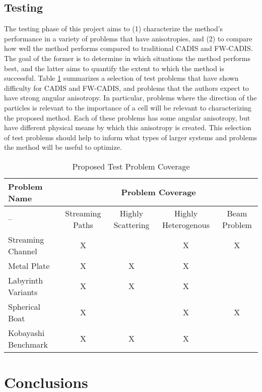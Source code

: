 \documentclass{mc2015}
\begin{document}
\subsection{Testing}
\label{sec:Testing}

The testing phase of this project aims to (1) characterize the method's performance in a variety of problems that have anisotropies, and (2) to compare how well the method performs compared to traditional CADIS and FW-CADIS.
The goal of the former is to determine in which situations the method performs best, and the latter aims to quantify the extent to which the method is successful. 
Table \ref{tab:testprobs} summarizes a selection of test problems that have shown difficulty for CADIS and FW-CADIS, and problems that the authors expect to have strong angular anisotropy. 
In particular, problems where the direction of the particles is relevant to the importance of a cell will be relevant to characterizing the proposed method. Each of these problems has some angular anisotropy, but have different physical means by which this anisotropy is created. This selection of test problems should help to inform what types of larger systems and problems the method will be useful to optimize. 

 \begin{table}
  \centering
  \caption{Proposed Test Problem Coverage}
  \begin{tabular}{l|cccc}
    \toprule
    Problem Name & \multicolumn{4}{c}{Problem Coverage} \\
    \hline
    -- & Streaming Paths & Highly Scattering & Highly Heterogenous & Beam Problem \\
    \hline
    Streaming Channel   & X & & X & X \\ 
    Metal Plate         & X & X & X &  \\
    Labyrinth Variants  & X & X & X &  \\ 
    Spherical Boat      & X & & X & X \\  
    Kobayashi Benchmark & X & X & X &  \\   
	\bottomrule
  \end{tabular}
  \label{tab:testprobs}
\end{table}


\section{Conclusions}
\label{sec:conclusions}
\end{document}
